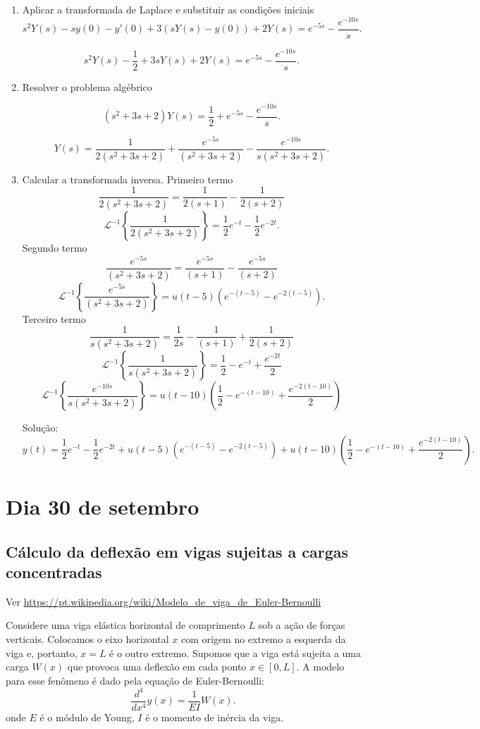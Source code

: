 \documentclass[a4paper,10pt]{book}
\begin{document}
 \begin{enumerate}
  \item Aplicar a transformada de Laplace e substituir as condições iniciais
  $$
  s^2 Y(s)-sy(0)-y'(0)+3(sY(s)-y(0))+2Y(s)=e^{-5s}-\frac{e^{-10s}}{s}.
  $$
 
  $$
  s^2 Y(s)-\frac{1}{2}+3sY(s)+2Y(s)=e^{-5s}-\frac{e^{-10s}}{s}.
  $$
 
  \item Resolver o problema algébrico
  
  $$
  (s^2+3s+2) Y(s)=\frac{1}{2}+e^{-5s}-\frac{e^{-10s}}{s}.
  $$
 
   $$
   Y(s)=\frac{1}{2(s^2+3s+2)}+\frac{e^{-5s}}{(s^2+3s+2)}-\frac{e^{-10s}}{s(s^2+3s+2)}.
  $$
 
  \item Calcular a transformada inversa.
  \subitem Primeiro termo
 $$
 \frac{1}{2(s^2+3s+2)}=\frac{1}{2(s+1)}-\frac{1}{2(s+2)} 
 $$
 $$
 \mathcal{L}^{-1}\left\{\frac{1}{2(s^2+3s+2)}\right\}=\frac{1}{2}e^{-t}-\frac{1}{2}e^{-2t}.
 $$
 \subitem Segundo termo
 $$
 \frac{e^{-5s}}{(s^2+3s+2)}=\frac{e^{-5s}}{(s+1)}-\frac{e^{-5s}}{(s+2)}
  $$
 $$
 \mathcal{L}^{-1}\left\{\frac{e^{-5s}}{(s^2+3s+2)}\right\}=u(t-5)\left(e^{-(t-5)}-e^{-2(t-5)}\right).
 $$
   \subitem Terceiro termo
 $$
 \frac{1}{s(s^2+3s+2)}=\frac{1}{2s}-\frac{1}{(s+1)}+\frac{1}{2(s+2)}
 $$
 $$
 \mathcal{L}^{-1}\left\{\frac{1}{s(s^2+3s+2)}\right\}=\frac{1}{2}-e^{-t}+\frac{e^{-2t}}{2}
 $$
 $$
 \mathcal{L}^{-1}\left\{\frac{e^{-10s}}{s(s^2+3s+2)}\right\}=u(t-10)\left(\frac{1}{2}-e^{-(t-10)}+\frac{e^{-2(t-10)}}{2}\right)
 $$
 
 
 Solução:
 $$
 y(t)=\frac{1}{2}e^{-t}-\frac{1}{2}e^{-2t}+u(t-5)\left(e^{-(t-5)}-e^{-2(t-5)}\right)+u(t-10)\left(\frac{1}{2}-e^{-(t-10)}+\frac{e^{-2(t-10)}}{2}\right).
 $$
\end{enumerate}
%                             
%                             

\chapter{Dia 30 de setembro}
%                             
\section{Cálculo da deflexão em vigas sujeitas a cargas concentradas}

Ver \url{https://pt.wikipedia.org/wiki/Modelo_de_viga_de_Euler-Bernoulli}

Considere uma viga elástica horizontal de comprimento $L$ sob a ação de forças verticais. Colocamos o eixo horizontal $x$ com origem no extremo a esquerda da viga e, portanto, $x=L$ é o outro extremo. Supomos que a viga está sujeita a uma carga $W(x)$ que provoca uma deflexão em cada ponto $x\in[0,L]$. A modelo para esse fenômeno é dado pela equação de Euler-Bernoulli:
\begin{equation}
\label{eq}\frac{d^4}{dx^4}y(x)=\frac{1}{EI}W(x).
\end{equation}
onde $E$ é o módulo de Young, $I$ é o momento de inércia da viga.
\end{document}
